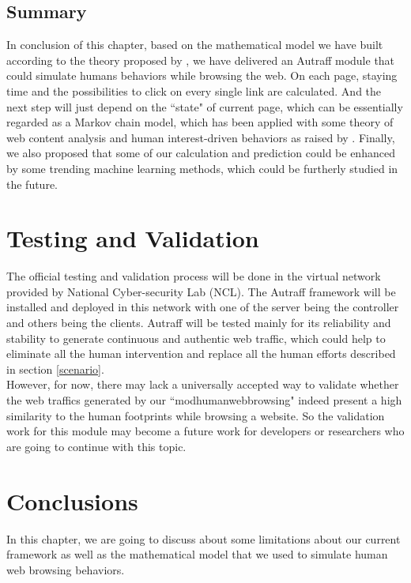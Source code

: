 \documentclass[12pt]{report}
\begin{document}
\section{Summary}
In conclusion of this chapter, based on the mathematical model we have built according to the theory proposed by \citet{yang}, we have delivered an Autraff module that could simulate human\textquotesingle s behaviors while browsing the web. On each page, staying time and the possibilities to click on every single link are calculated. And the next step will just depend on the ``state" of current page, which can be essentially regarded as a Markov chain model, which has been applied with some theory of web content analysis and human interest-driven behaviors as raised by \citet{interest-theo}. Finally, we also proposed that some of our calculation and prediction could be enhanced by some trending machine learning methods, which could be furtherly studied in the future.\\



\chapter{Testing and Validation} \label{tv}
The official testing and validation process will be done in the virtual network provided by National Cyber-security Lab (NCL). The Autraff framework will be installed and deployed in this network with one of the server being the controller and others being the clients. Autraff will be tested mainly for its reliability and stability to generate continuous and authentic web traffic, which could help to eliminate all the human intervention and replace all the human efforts described in section \ref{scenario}.\\

However, for now, there may lack a universally accepted way to validate whether the web traffics generated by our ``mod\textunderscore human\textunderscore web\textunderscore browsing" indeed present a high similarity to the human footprints while browsing a website. So the validation work for this module may become a future work for developers or researchers who are going to continue with this topic.

\chapter{Conclusions}
In this chapter, we are going to discuss about some limitations about our current framework as well as the mathematical model that we used to simulate human web browsing behaviors.
\end{document}
